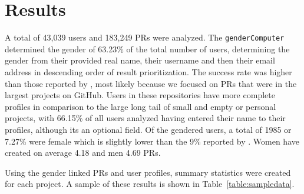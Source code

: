 

\section{Results}

A total of 43,039 users and 183,249 \ac{PR}s were analyzed.
The \lstinline|genderComputer| determined the gender of 63.23\% of the total number of users, determining the gender from their provided real name, their username and then their email address in descending order of result prioritization.
The success rate was higher than those reported by \citeauthor{vasilescu:2012:6542459}, most likely because we focused on \ac{PR}s that were in the largest projects on GitHub. Users in these repositories have more complete profiles in comparison to the large long tail of small and empty or personal projects, with 66.15\% of all users analyzed having entered their name to their profiles, although its an optional field. Of the gendered users, a total of 1985 or 7.27\% were female which is slightly lower than the 9\% reported by \cite{vasilescu:2012:6542459}. Women have created on average 4.18 and men 4.69 \ac{PR}s.

Using the gender linked \ac{PR}s and user profiles, summary statistics were created for each project. A sample of these results is shown in Table~\ref{table:sampledata}.


